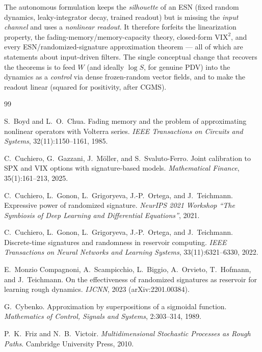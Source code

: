 \documentclass[11pt]{article}
\theoremstyle{definition}
\theoremstyle{plain}
\begin{document}
The autonomous formulation keeps the \emph{silhouette} of an ESN (fixed random dynamics, leaky-integrator decay, trained readout) but is missing the \emph{input channel} and uses a \emph{nonlinear readout}. It therefore forfeits the linearization property, the fading-memory/memory-capacity theory, closed-form $\mathrm{VIX}^2$, and every ESN/randomized-signature approximation theorem --- all of which are statements about input-driven filters. The single conceptual change that recovers the theorems is to feed $W$ (and ideally $\log S$, for genuine PDV) into the dynamics as a \emph{control} via dense frozen-random vector fields, and to make the readout linear (squared for positivity, after CGMS).

\begin{thebibliography}{99}

 S.\ Boyd and L.\ O.\ Chua. Fading memory and the problem of approximating nonlinear operators with Volterra series. \emph{IEEE Transactions on Circuits and Systems}, 32(11):1150--1161, 1985.

 C.\ Cuchiero, G.\ Gazzani, J.\ M\"oller, and S.\ Svaluto-Ferro. Joint calibration to SPX and VIX options with signature-based models. \emph{Mathematical Finance}, 35(1):161--213, 2025.

 C.\ Cuchiero, L.\ Gonon, L.\ Grigoryeva, J.-P.\ Ortega, and J.\ Teichmann. Expressive power of randomized signature. \emph{NeurIPS 2021 Workshop ``The Symbiosis of Deep Learning and Differential Equations''}, 2021.

 C.\ Cuchiero, L.\ Gonon, L.\ Grigoryeva, J.-P.\ Ortega, and J.\ Teichmann. Discrete-time signatures and randomness in reservoir computing. \emph{IEEE Transactions on Neural Networks and Learning Systems}, 33(11):6321--6330, 2022.

 E.\ Monzio Compagnoni, A.\ Scampicchio, L.\ Biggio, A.\ Orvieto, T.\ Hofmann, and J.\ Teichmann. On the effectiveness of randomized signatures as reservoir for learning rough dynamics. \emph{IJCNN}, 2023 (arXiv:2201.00384).

 G.\ Cybenko. Approximation by superpositions of a sigmoidal function. \emph{Mathematics of Control, Signals and Systems}, 2:303--314, 1989.

 P.\ K.\ Friz and N.\ B.\ Victoir. \emph{Multidimensional Stochastic Processes as Rough Paths}. Cambridge University Press, 2010.


\end{thebibliography}
\end{document}
